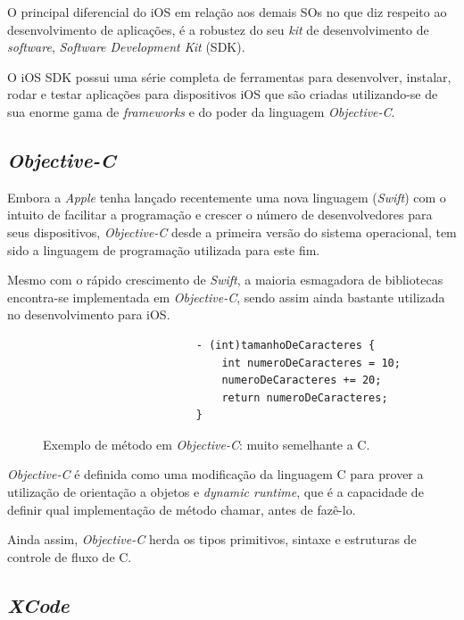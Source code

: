\documentclass[
    12pt,               %
    openright,          %
    oneside,
    a4paper,            
    english,            %
    brazil              %
    ]{abntex2}
\begin{document}
O principal diferencial do iOS em relação aos demais SOs no que diz respeito ao desenvolvimento de aplicações, é a robustez do seu \textit{kit} de desenvolvimento de \textit{software}, \textit{Software Development Kit} (SDK).

O iOS SDK possui uma série completa de ferramentas para desenvolver, instalar, rodar e testar aplicações para dispositivos iOS que são criadas utilizando-se de sua enorme gama de \textit{frameworks} e do poder da linguagem \textit{Objective-C}. 

\subsection{\textit{Objective-C}}

Embora a \textit{Apple} tenha lançado recentemente uma nova linguagem (\textit{Swift}) com o intuito de facilitar a programação e crescer o número de desenvolvedores para seus dispositivos, \textit{Objective-C} desde a primeira versão do sistema operacional, tem sido a linguagem de programação utilizada para este fim. 

Mesmo com o rápido crescimento de \textit{Swift}, a maioria esmagadora de bibliotecas encontra-se implementada em \textit{Objective-C}, sendo assim ainda bastante utilizada no desenvolvimento para iOS. 

\begin{figure}[!htb]
  \begin{center}
    \caption{Exemplo de método em \textit{Objective-C}: muito semelhante a C.}
    \begin{verbatim}
                        - (int)tamanhoDeCaracteres {
                            int numeroDeCaracteres = 10;
                            numeroDeCaracteres += 20;
                            return numeroDeCaracteres;
                        }
    \end{verbatim}
  \end{center}
\end{figure}
\textit{Objective-C} é definida como uma modificação da linguagem C para prover a utilização de orientação a objetos e \textit{dynamic runtime}, que é a capacidade de definir qual implementação de método chamar, antes de fazê-lo.

Ainda assim, \textit{Objective-C} herda os tipos primitivos, sintaxe e estruturas de controle de fluxo de C.

\subsection{\textit{XCode}}
\end{document}
